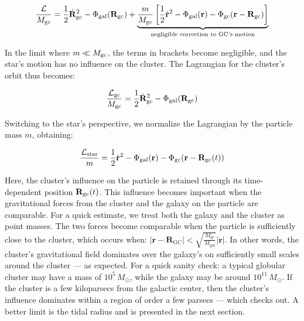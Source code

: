         \begin{equation}
            \frac{\mathcal{L}}{M_{\rm gc}} = \frac{1}{2} \dot{\mathbf{R}}_{\rm gc}^2 
                                        - \Phi_{\rm gal}(\mathbf{R}_{\rm gc}) 
                                        + \underbrace{\frac{m}{M_{\rm gc}} \left[ \frac{1}{2} \dot{\mathbf{r}}^2 
                                        - \Phi_{\rm gal}(\mathbf{r}) 
                                        - \Phi_{\rm gc}(\mathbf{r} - \mathbf{R}_{\rm gc}) \right]}_{\text{negligible correction to GC's motion}}
        \end{equation}

        In the limit where \( m \ll M_{\rm gc} \), the terms in brackets become negligible, and the star's motion has no influence on the cluster. The Lagrangian for the cluster's orbit thus becomes:

        \begin{equation}
            \frac{\mathcal{L}_{\mathrm{gc}}}{M_{\mathrm{gc}}} = \frac{1}{2} \dot{\mathbf{R}}_{\rm gc}^2 
                                - \Phi_{\rm gal}(\mathbf{R}_{\rm gc})
        \end{equation}

        Switching to the star's perspective, we normalize the Lagrangian by the particle mass \( m \), obtaining:

        \begin{equation}
            \frac{\mathcal{L}_{\rm star}}{m} = \frac{1}{2} \dot{\mathbf{r}}^2 
                                - \Phi_{\rm gal}(\mathbf{r}) 
                                - \Phi_{\rm gc}(\mathbf{r} - \mathbf{R}_{\rm gc}(t))
        \end{equation}

        Here, the cluster's influence on the particle is retained through its time-dependent position \( \mathbf{R}_{\rm gc}(t) \). This influence becomes important when the gravitational forces from the cluster and the galaxy on the particle are comparable. For a quick estimate, we treat both the galaxy and the cluster as point masses. The two forces become comparable when the particle is sufficiently close to the cluster, which occurs when: $|\mathbf{r} - \mathbf{R}_\mathrm{GC}| < \sqrt{\frac{M_{\mathrm{gc}}}{M_{\mathrm{ gal}}}} |\mathbf{r}|.$ In other words, the cluster's gravitational field dominates over the galaxy's on sufficiently small scales around the cluster — as expected. For a quick sanity check: a typical globular cluster may have a mass of \(10^5\, M_\odot\), while the galaxy may be around \(10^{11}\, M_\odot\). If the cluster is a few kiloparsecs from the galactic center, then the cluster's influence dominates within a region of order a few parsecs — which checks out. A better limit is the tidal radius and is presented in the next section.

